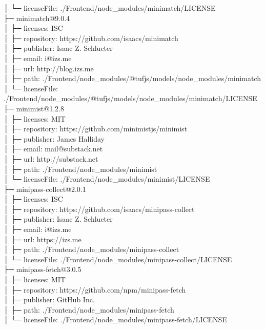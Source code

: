 \documentclass[
    paper=a4,
    twoside=false,
    parskip=half,
    listof=entryprefix,
    listof=totoc,
    index=totoc,
    bibliography=totoc,
    headsepline,
]{scrbook}
\begin{document}
    │  └─ licenseFile: ./Frontend/node\_modules/minimatch/LICENSE\\
    ├─ minimatch@9.0.4\\
    │  ├─ licenses: ISC\\
    │  ├─ repository: https://github.com/isaacs/minimatch\\
    │  ├─ publisher: Isaac Z. Schlueter\\
    │  ├─ email: i@izs.me\\
    │  ├─ url: http://blog.izs.me\\
    │  ├─ path: ./Frontend/node\_modules/@tufjs/models/node\_modules/minimatch\\
    │  └─ licenseFile: ./Frontend/node\_modules/@tufjs/models/node\_modules/minimatch/LICENSE\\
    ├─ minimist@1.2.8\\
    │  ├─ licenses: MIT\\
    │  ├─ repository: https://github.com/minimistjs/minimist\\
    │  ├─ publisher: James Halliday\\
    │  ├─ email: mail@substack.net\\
    │  ├─ url: http://substack.net\\
    │  ├─ path: ./Frontend/node\_modules/minimist\\
    │  └─ licenseFile: ./Frontend/node\_modules/minimist/LICENSE\\
    ├─ minipass-collect@2.0.1\\
    │  ├─ licenses: ISC\\
    │  ├─ repository: https://github.com/isaacs/minipass-collect\\
    │  ├─ publisher: Isaac Z. Schlueter\\
    │  ├─ email: i@izs.me\\
    │  ├─ url: https://izs.me\\
    │  ├─ path: ./Frontend/node\_modules/minipass-collect\\
    │  └─ licenseFile: ./Frontend/node\_modules/minipass-collect/LICENSE\\
    ├─ minipass-fetch@3.0.5\\
    │  ├─ licenses: MIT\\
    │  ├─ repository: https://github.com/npm/minipass-fetch\\
    │  ├─ publisher: GitHub Inc.\\
    │  ├─ path: ./Frontend/node\_modules/minipass-fetch\\
    │  └─ licenseFile: ./Frontend/node\_modules/minipass-fetch/LICENSE\\
\end{document}
